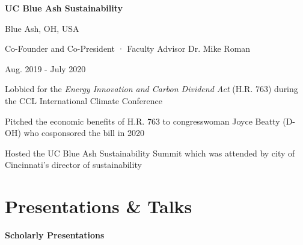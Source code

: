     \begin{minipage}{.75\linewidth} \begin{flushleft}
    		\textbf{UC Blue Ash Sustainability}
    	\end{flushleft} \end{minipage}
    \hfill 
    \begin{minipage}{.20\linewidth}\begin{flushright}
    	 Blue Ash, OH, USA
    	\end{flushright}\end{minipage}
     
    \begin{minipage}{.75\linewidth} \begin{flushleft}
    		Co-Founder and Co-President · Faculty Advisor Dr. Mike Roman
    	\end{flushleft} \end{minipage}
    \hfill 
    \begin{minipage}{.20\linewidth}\begin{flushright}
    	 Aug. 2019 - July 2020
    	\end{flushright}\end{minipage}
        \vspace{-5pt}
	\begin{description}[font=$\bullet$]
        \item{Lobbied for the \textit{Energy Innovation and Carbon Dividend Act} (H.R. 763) during the CCL International Climate Conference}
        \vspace{-6pt}
        \item{Pitched the economic benefits of H.R. 763 to congresswoman Joyce Beatty (D-OH) who cosponsored the bill in 2020}
        \vspace{-6pt}
        \item{Hosted the UC Blue Ash Sustainability Summit which was attended by city of Cincinnati’s director of sustainability}
\end{description}

\vspace{-5pt}
\section{Presentations \& Talks}
\begin{minipage}{.75\linewidth}
  \textbf{Scholarly Presentations}
\end{minipage} \\

